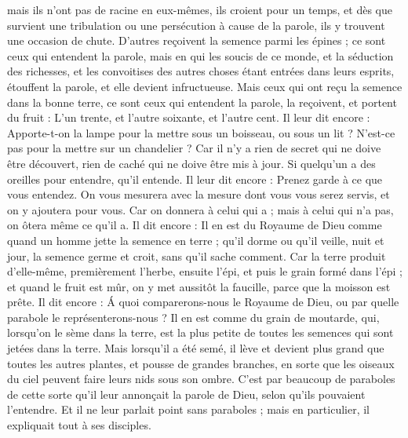 \begin{multicols}{2}
mais ils n'ont pas de racine en eux-mêmes, ils croient pour un temps, et dès que survient une tribulation ou une persécution à cause de la parole, ils y trouvent une occasion de chute.
D’autres reçoivent la semence parmi les épines ; ce sont ceux qui entendent la parole,
mais en qui les soucis de ce monde, et la séduction des richesses, et les convoitises des autres choses étant entrées dans leurs esprits, étouffent la parole, et elle devient infructueuse.
Mais ceux qui ont reçu la semence dans la bonne terre, ce sont ceux qui entendent la parole, la reçoivent, et portent du fruit : L'un trente, et l'autre soixante, et l'autre cent{}.
Il leur dit encore : Apporte-t-on la lampe pour la mettre sous un boisseau, ou sous un lit ? N'est-ce pas pour la mettre sur un chandelier ?
Car il n'y a rien de secret qui ne doive être découvert, rien de caché qui ne doive être mis à jour.
Si quelqu'un a des oreilles pour entendre, qu'il entende.
Il leur dit encore : Prenez garde à ce que vous entendez. On vous mesurera avec la mesure dont vous vous serez servis, et on y ajoutera pour vous.
Car on donnera à celui qui a ; mais à celui qui n’a pas, on ôtera même ce qu’il a.
Il dit encore : Il en est du Royaume de Dieu comme quand un homme jette la semence en terre ;
qu’il dorme ou qu’il veille, nuit et jour, la semence germe et croit, sans qu'il sache comment.
Car la terre produit d'elle-même, premièrement l'herbe, ensuite l'épi, et puis le grain formé dans l'épi ;
et quand le fruit est mûr, on y met aussitôt la faucille, parce que la moisson est prête.
Il dit encore : Á quoi comparerons-nous le Royaume de Dieu, ou par quelle parabole le représenterons-nous ?
Il en est comme du grain de moutarde, qui, lorsqu'on le sème dans la terre, est la plus petite de toutes les semences qui sont jetées dans la terre.
Mais lorsqu'il a été semé, il lève et devient plus grand que toutes les autres plantes, et pousse de grandes branches, en sorte que les oiseaux du ciel peuvent faire leurs nids sous son ombre.
C’est par beaucoup de paraboles de cette sorte qu’il leur annonçait la parole de Dieu, selon qu'ils pouvaient l'entendre.
Et il ne leur parlait point sans paraboles ; mais en particulier, il expliquait tout à ses disciples.

\end{multicols}

